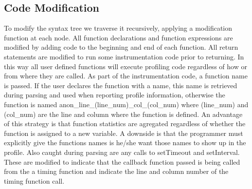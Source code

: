 \documentclass[11pt]{article}
\begin{document}
\subsection{Code Modification}
	
	To modify the syntax tree we traverse it recursively, applying a modification function at each node.
All function declarations and function expressions are modified by adding code to the beginning and end 
of each function. All return statements are modified to run some instrumentation code prior to returning. 
In this way all user defined functions will execute profiling code regardless of how or from where 
they are called. As part of the instrumentation code, a function name is passed. If the user declares 
the function with a name, this name is retrieved during parsing and used when reporting profile information, 
otherwise the function is named anon\_line\_(line\_num)\_col\_(col\_num) where (line\_num) and (col\_num) are the line 
and column where the function is defined. An advantage of this strategy is that function statistics are 
agregated regardless of whether the function is assigned to a new variable. A downside is that the programmer 
must explicitly give the functions names is he/she want those names to show up in the profile. Also caught 
during parsing are any calls to setTimeout and setInterval. These are modified to 
indicate that the callback function passed is being called from the a timing function and indicate the 
line and column number of the timing function call. 
\end{document}
